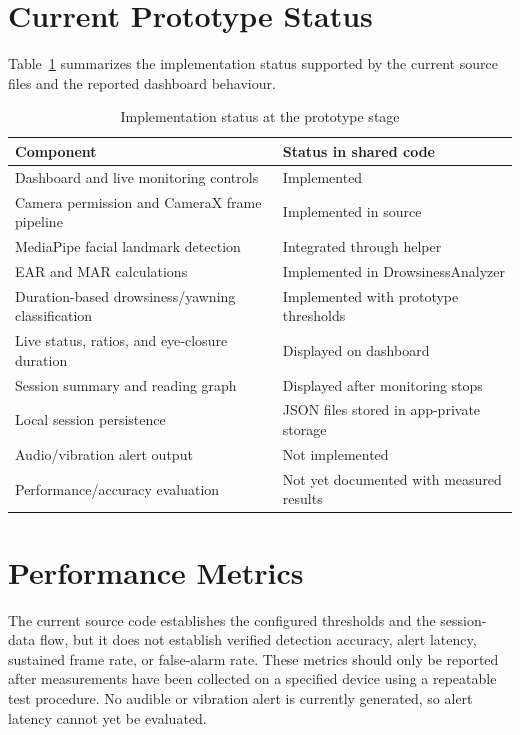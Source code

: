\documentclass{tietreport}
\begin{document}
\section{Current Prototype Status}
Table~\ref{tab:status} summarizes the implementation status supported by the current source files and the reported dashboard behaviour.

\begin{table}[H]
\centering
\caption{Implementation status at the prototype stage}
\label{tab:status}
\begin{tabular}{p{} p{}}
\toprule
\textbf{Component} & \textbf{Status in shared code} \\
\midrule
Dashboard and live monitoring controls & Implemented \\
Camera permission and CameraX frame pipeline & Implemented in source \\
MediaPipe facial landmark detection & Integrated through helper \\
EAR and MAR calculations & Implemented in DrowsinessAnalyzer \\
Duration-based drowsiness/yawning classification & Implemented with prototype thresholds \\
Live status, ratios, and eye-closure duration & Displayed on dashboard \\
Session summary and reading graph & Displayed after monitoring stops \\
Local session persistence & JSON files stored in app-private storage \\
Audio/vibration alert output & Not implemented \\
Performance/accuracy evaluation & Not yet documented with measured results \\
\bottomrule
\end{tabular}
\end{table}

\section{Performance Metrics}
The current source code establishes the configured thresholds and the session-data flow, but it does not establish verified detection accuracy, alert latency, sustained frame rate, or false-alarm rate. These metrics should only be reported after measurements have been collected on a specified device using a repeatable test procedure. No audible or vibration alert is currently generated, so alert latency cannot yet be evaluated.
\end{document}
